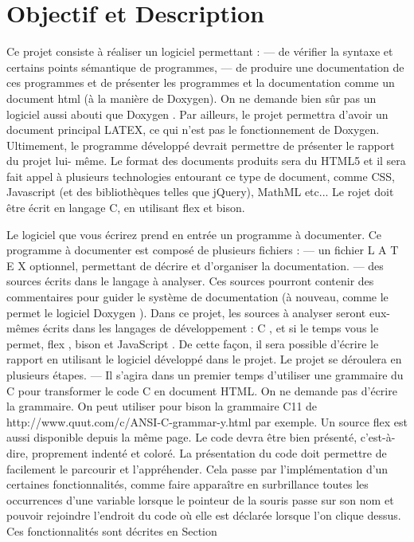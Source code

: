 \documentclass{report}
\begin{document}
\section{Objectif et Description}
{
Ce projet consiste à réaliser un logiciel permettant :
— de vérifier la syntaxe et certains points sémantique de programmes,
— de produire une documentation de ces programmes et de présenter les programmes et la documentation comme un document html (à la manière de Doxygen).
On ne demande bien sûr pas un logiciel aussi abouti que
Doxygen
. Par ailleurs, le projet permettra
d’avoir un document principal LATEX, ce qui n’est pas le fonctionnement de
Doxygen.
Ultimement, le programme développé devrait permettre de présenter le rapport du projet lui-
même. Le format des documents produits sera du HTML5 et il sera fait appel à plusieurs technologies
entourant ce type de document, comme CSS, Javascript (et des bibliothèques telles que jQuery),
MathML etc... Le  rojet doit être écrit en langage C, en utilisant flex et bison.



Le logiciel que vous écrirez prend en entrée un programme à documenter. Ce programme à
documenter est composé de plusieurs fichiers :
—
un fichier L
A
T
E
X optionnel, permettant de décrire et d’organiser la documentation.
—
des sources écrits dans le langage à analyser. Ces sources pourront contenir des commentaires
pour guider le système de documentation (à nouveau, comme le permet le logiciel
Doxygen
).
Dans ce projet, les sources à analyser seront eux-mêmes écrits dans les langages de développement :
C
, et si le temps vous le permet,
flex
,
bison
et
JavaScript
. De cette façon, il sera possible d’écrire
le rapport en utilisant le logiciel développé dans le projet.
Le projet se déroulera en plusieurs étapes.
—
Il s’agira dans un premier temps d’utiliser une grammaire du C pour transformer le code
C en document HTML. On ne demande pas d’écrire la grammaire. On peut utiliser pour
bison la grammaire C11 de
http://www.quut.com/c/ANSI-C-grammar-y.html
par exemple.
Un source flex est aussi disponible depuis la même page.
Le code devra être bien présenté, c’est-à-dire, proprement indenté et coloré. La présentation du
code doit permettre de facilement le parcourir et l’appréhender. Cela passe par l’implémentation
d’un certaines fonctionnalités, comme faire apparaître en surbrillance toutes les occurrences
d’une variable lorsque le pointeur de la souris passe sur son nom et pouvoir rejoindre l’endroit
du code où elle est déclarée lorsque l’on clique dessus.
Ces fonctionnalités sont décrites en Section


}
\end{document}
